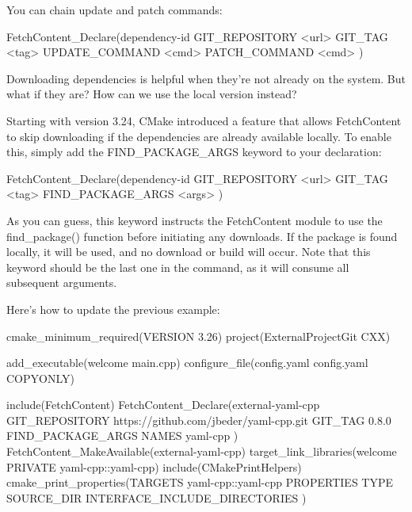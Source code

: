 You can chain update and patch commands:

\begin{shell}
FetchContent_Declare(dependency-id
                     GIT_REPOSITORY <url>
                     GIT_TAG <tag>
                     UPDATE_COMMAND <cmd>
                     PATCH_COMMAND <cmd>
)
\end{shell}

Downloading dependencies is helpful when they’re not already on the system. But what if they are? How can we use the local version instead?


Starting with version 3.24, CMake introduced a feature that allows FetchContent to skip downloading if the dependencies are already available locally. To enable this, simply add the FIND\_PACKAGE\_ARGS keyword to your declaration:

\begin{shell}
FetchContent_Declare(dependency-id
                     GIT_REPOSITORY <url>
                     GIT_TAG <tag>
                     FIND_PACKAGE_ARGS <args>
)
\end{shell}

As you can guess, this keyword instructs the FetchContent module to use the find\_package() function before initiating any downloads. If the package is found locally, it will be used, and no download or build will occur. Note that this keyword should be the last one in the command, as it will consume all subsequent arguments.

Here’s how to update the previous example:


\begin{cmake}
cmake_minimum_required(VERSION 3.26)
project(ExternalProjectGit CXX)

add_executable(welcome main.cpp)
configure_file(config.yaml config.yaml COPYONLY)

include(FetchContent)
FetchContent_Declare(external-yaml-cpp
    GIT_REPOSITORY    https://github.com/jbeder/yaml-cpp.git
    GIT_TAG           0.8.0
    FIND_PACKAGE_ARGS NAMES yaml-cpp
)
FetchContent_MakeAvailable(external-yaml-cpp)
target_link_libraries(welcome PRIVATE yaml-cpp::yaml-cpp)
include(CMakePrintHelpers)
cmake_print_properties(TARGETS yaml-cpp::yaml-cpp
                       PROPERTIES TYPE SOURCE_DIR
                       INTERFACE_INCLUDE_DIRECTORIES
)
\end{cmake}

